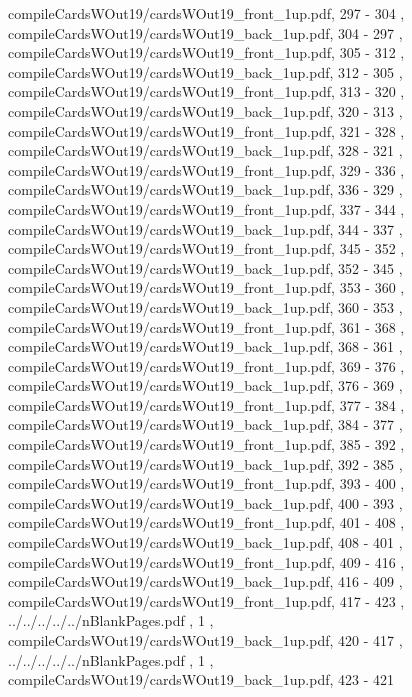 \documentclass[letterpaper]{article}
\begin{document}
{									compileCardsWOut19/cardsWOut19_front_1up.pdf,		297		-		304		,
									compileCardsWOut19/cardsWOut19_back_1up.pdf,			304		-		297		,
									compileCardsWOut19/cardsWOut19_front_1up.pdf,		305		-		312		,
									compileCardsWOut19/cardsWOut19_back_1up.pdf,			312		-		305		,
									compileCardsWOut19/cardsWOut19_front_1up.pdf,		313		-		320		,
									compileCardsWOut19/cardsWOut19_back_1up.pdf,			320		-		313		,
									compileCardsWOut19/cardsWOut19_front_1up.pdf,		321		-		328		,
									compileCardsWOut19/cardsWOut19_back_1up.pdf,			328		-		321		,
									compileCardsWOut19/cardsWOut19_front_1up.pdf,		329		-		336		,
									compileCardsWOut19/cardsWOut19_back_1up.pdf,			336		-		329		,
									compileCardsWOut19/cardsWOut19_front_1up.pdf,		337		-		344		,
									compileCardsWOut19/cardsWOut19_back_1up.pdf,			344		-		337		,
									compileCardsWOut19/cardsWOut19_front_1up.pdf,		345		-		352		,
									compileCardsWOut19/cardsWOut19_back_1up.pdf,			352		-		345		,
									compileCardsWOut19/cardsWOut19_front_1up.pdf,		353		-		360		,
									compileCardsWOut19/cardsWOut19_back_1up.pdf,			360		-		353		,
									compileCardsWOut19/cardsWOut19_front_1up.pdf,		361		-		368		,
									compileCardsWOut19/cardsWOut19_back_1up.pdf,			368		-		361		,
									compileCardsWOut19/cardsWOut19_front_1up.pdf,		369		-		376		,
									compileCardsWOut19/cardsWOut19_back_1up.pdf,			376		-		369		,
									compileCardsWOut19/cardsWOut19_front_1up.pdf,		377		-		384		,
									compileCardsWOut19/cardsWOut19_back_1up.pdf,			384		-		377		,
									compileCardsWOut19/cardsWOut19_front_1up.pdf,		385		-		392		,
									compileCardsWOut19/cardsWOut19_back_1up.pdf,			392		-		385		,
									compileCardsWOut19/cardsWOut19_front_1up.pdf,		393		-		400		,
									compileCardsWOut19/cardsWOut19_back_1up.pdf,			400		-		393		,
									compileCardsWOut19/cardsWOut19_front_1up.pdf,		401		-		408		,
									compileCardsWOut19/cardsWOut19_back_1up.pdf,			408		-		401		,
									compileCardsWOut19/cardsWOut19_front_1up.pdf,		409		-		416		,
									compileCardsWOut19/cardsWOut19_back_1up.pdf,			416		-		409		,
									compileCardsWOut19/cardsWOut19_front_1up.pdf,		417		-		423		,
									../../../../../nBlankPages.pdf 											,			1							,
									compileCardsWOut19/cardsWOut19_back_1up.pdf,		420		-		417		,
									../../../../../nBlankPages.pdf 											,			1							,
									compileCardsWOut19/cardsWOut19_back_1up.pdf,		423		-		421		
								}
	
\end{document}
